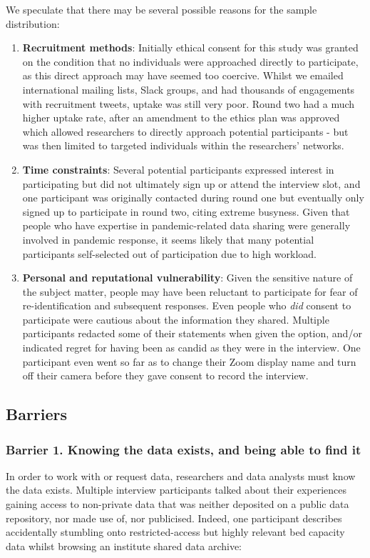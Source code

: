 \documentclass{CUP-JNL-DAP}%
\begin{document}
We speculate that there may be several possible reasons for the sample distribution:
\begin{enumerate}
\item \textbf{Recruitment methods}: Initially ethical consent for this study was granted on the condition that no individuals were approached directly to participate, as this direct approach may have seemed too coercive. Whilst we emailed international mailing lists, Slack groups, and had thousands of engagements with recruitment tweets, uptake was still very poor. Round two had a much higher uptake rate, after an amendment to the ethics plan was approved which allowed researchers to directly approach potential participants - but was then limited to targeted individuals within the researchers' networks. 
\item \textbf{Time constraints}: Several potential participants expressed interest in participating but did not ultimately sign up or attend the interview slot, and one participant was originally contacted during round one but eventually only signed up to participate in round two, citing extreme busyness. Given that people who have expertise in pandemic-related data sharing were generally involved in pandemic response, it seems likely that many potential participants self-selected out of participation due to high workload.
\item \textbf{Personal and reputational vulnerability}: Given the sensitive nature of the subject matter, people may have been reluctant to participate for fear of re-identification and subsequent responses. Even people who \textit{did} consent to participate were cautious about the information they shared. Multiple participants redacted some of their statements when given the option, and/or indicated regret for having been as candid as they were in the interview. One participant even went so far as to change their Zoom display name and turn off their camera before they gave consent to record the interview. 
\end{enumerate}

\subsection{Barriers}

\subsubsection{Barrier 1. Knowing the data exists, and being able to find it}
In order to work with or request data, researchers and data analysts must know the data exists. Multiple interview participants talked about their experiences gaining access to non-private data that was neither deposited on a public data repository, nor made use of, nor publicised. Indeed, one participant describes accidentally stumbling onto restricted-access but highly relevant bed capacity data whilst browsing an institute shared data archive: 
\end{document}
